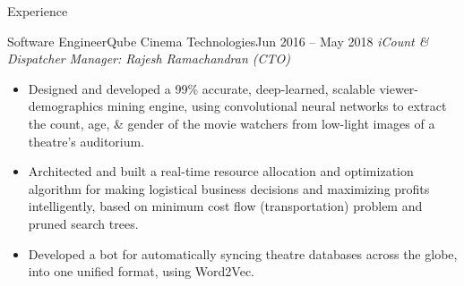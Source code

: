 \documentclass[]{mcdowellcv}
\begin{document}
\begin{cvsection}{Experience}
		\begin{cvsubsection}{Software Engineer}{Qube Cinema Technologies}{Jun 2016 – May 2018}
			\textit{iCount \& Dispatcher} \hfill \textit{Manager: Rajesh Ramachandran (CTO)}
			\begin{itemize}
            \item Designed and developed a 99\% accurate, deep-learned, scalable viewer-demographics mining engine, using convolutional neural networks to extract the count, age, \& gender of the movie watchers from low-light images of a theatre's auditorium. %
            \item Architected and built a real-time resource allocation and optimization algorithm for making logistical business decisions and maximizing profits intelligently, based on minimum cost flow (transportation) problem and pruned search trees.
            \item Developed a bot for automatically syncing theatre databases across the globe, into one unified format, using Word2Vec.
			\end{itemize}
		\end{cvsubsection}



\end{cvsection}
\end{document}
